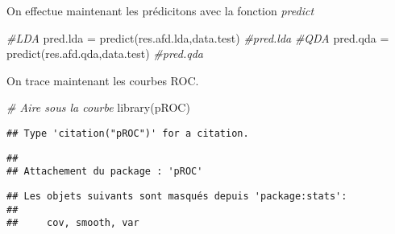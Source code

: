 \documentclass[
]{article}
\newenvironment{Shaded}{\begin{snugshade}}{\end{snugshade}}
\newcommand{\CommentTok}[1]{\textcolor[rgb]{0.56,0.35,0.01}{\textit{#1}}}
\newcommand{\DecValTok}[1]{\textcolor[rgb]{0.00,0.00,0.81}{#1}}
\newcommand{\FunctionTok}[1]{\textcolor[rgb]{0.00,0.00,0.00}{#1}}
\newcommand{\NormalTok}[1]{#1}
\newcommand{\OtherTok}[1]{\textcolor[rgb]{0.56,0.35,0.01}{#1}}
\newcommand{\SpecialCharTok}[1]{\textcolor[rgb]{0.00,0.00,0.00}{#1}}
\begin{document}
On effectue maintenant les prédicitons avec la fonction \emph{predict}

\begin{Shaded}
\begin{Highlighting}[]
\CommentTok{\#LDA}
\NormalTok{pred.lda }\OtherTok{=} \FunctionTok{predict}\NormalTok{(res.afd.lda,data.test)}
\CommentTok{\#pred.lda}
\CommentTok{\#QDA}
\NormalTok{pred.qda }\OtherTok{=} \FunctionTok{predict}\NormalTok{(res.afd.qda,data.test)}
\CommentTok{\#pred.qda}
\end{Highlighting}
\end{Shaded}

On trace maintenant les courbes ROC.

\begin{Shaded}
\begin{Highlighting}[]
\CommentTok{\# Aire sous la courbe}
\FunctionTok{library}\NormalTok{(pROC)}
\end{Highlighting}
\end{Shaded}

\begin{verbatim}
## Type 'citation("pROC")' for a citation.
\end{verbatim}

\begin{verbatim}
## 
## Attachement du package : 'pROC'
\end{verbatim}

\begin{verbatim}
## Les objets suivants sont masqués depuis 'package:stats':
## 
##     cov, smooth, var
\end{verbatim}

\begin{Shaded}
\end{Shaded}

\begin{Shaded}
\end{Shaded}
\end{document}
